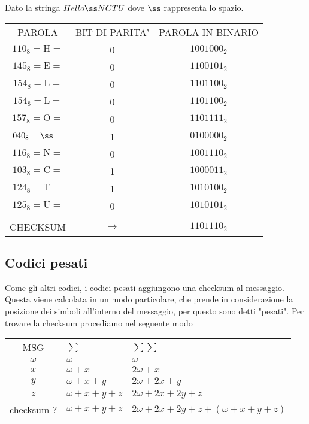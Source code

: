 \documentclass[12pt]{report}
\begin{document}
    \begin{exmp}
        Dato la stringa $Hello\ss NCTU$ dove $\ss$ rappresenta lo spazio.

        \begin{center}
            \begin{tabular}{ccc}
                PAROLA & BIT DI PARITA' & PAROLA IN BINARIO \\
                $110_8 = \text{H} =$ & 0 & $1001000_2$ \\
                $145_8 = \text{E} =$ & 0 & $1100101_2$ \\
                $154_8 = \text{L} =$ & 0 & $1101100_2$ \\
                $154_8 = \text{L} =$ & 0 & $1101100_2$ \\
                $157_8 = \text{O} =$ & 0 & $1101111_2$ \\
                $040_8 = \ss =$ & 1 & $0100000_2$ \\
                $116_8 = \text{N} =$ & 0 & $1001110_2$\\
                $103_8 = \text{C} =$ & 1 & $1000011_2$\\
                $124_8 = \text{T} =$ & 1 & $1010100_2$\\
                $125_8 = \text{U} =$ & 0 & $1010101_2$\\
                & & \\
                CHECKSUM & $\rightarrow$& $1101110_2$
            \end{tabular}
        \end{center}
    \end{exmp}

    \subsection{Codici pesati}
    Come gli altri codici,  i codici pesati aggiungono una checksum al messaggio. Questa viene calcolata in un modo particolare, che prende in considerazione la posizione dei simboli all'interno del messaggio, per questo sono detti "pesati". Per trovare la checksum procediamo nel seguente modo

    \begin{center}
        \begin{tabular}{cll}
            MSG & $\sum$ & $\sum \sum$\\
            $\omega$ & $\omega$ & $\omega$ \\
            $x$ & $\omega + x$& $2\omega + x$ \\
            $y$ & $\omega + x + y$& $2\omega + 2x + y$ \\
            $z$ & $\omega + x + y + z$& $2\omega + 2x + 2y +z$ \\
            checksum $?$ & $\omega + x + y + z$ & $ 2\omega + 2x + 2y +z + (\omega + x + y + z)$ \\
        \end{tabular}

    \end{center}
\end{document}
